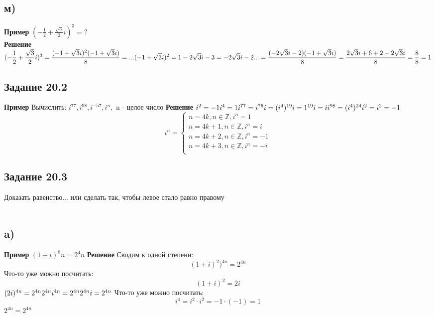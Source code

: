 \documentclass[12pt]{article}
\begin{document}
\newpage
\subsection{м)}
\textbf{Пример}
$
\displaystyle
(-\frac{1}{2} +\frac{\sqrt3}{2}i)^3=?
$\\
\textbf{Решение}
$
\displaystyle
(-\frac{1}{2} +\frac{\sqrt3}{2}i)^3=
\frac{(-1+\sqrt3i)^2(-1+\sqrt3i)}{8}=...\\
\\
(-1+\sqrt3i)^2=1-2\sqrt3i-3=-2\sqrt3i-2\\
\\
...=\frac{(-2\sqrt3i-2)(-1+\sqrt3i)}{8}=
\frac{2\sqrt3i+6+2-2\sqrt3i}{8}=
\frac{8}{8}=1
$

\newpage
\subsection{Задание 20.2}

\textbf{Пример}
Вычислить: 
$
i^{77}, i^{98}, i^{-57}, i^n,
$ n  - целое число
\textbf{Решение}
$
i^2=-1\\
i^4=1\\
i^{77}=i^{76}i=(i^4)^{19}i=1^{19}i=i\\
i^{98}=(i^4)^{24}i^2=i^2=-1\\
$
\begin{equation*}
i^n= 
 \begin{cases}
n = 4k,n \in \mathbb {Z}, i^n = 1\\
n = 4k+1,n \in \mathbb {Z}, i^n = i\\
n = 4k+2,n \in \mathbb {Z}, i^n = -1\\
n = 4k+3,n \in \mathbb {Z}, i^n = -i\\   
 \end{cases}
\end{equation*}

\newpage
\subsection{Задание 20.3}
Доказать равенство... или сделать так, чтобы левое стало равно правому\\
\\
\subsection{a)}
\textbf{Пример}
$
(1+i)^8n=2^4n
$
\textbf{Решение}
Сводим к одной степени:
$$
(1+i)^2)^{4n}=2^{4n}
$$
Что-то уже можно посчитать:
$$
(1+i)^2 = 2i
$$
$
(2i)^{4n}=2^{4n}
2^{4n}i^{4n}=2^{4n}
2^{4n}i=2^{4n} \\
$
Что-то уже можно посчитать:
$$
i^4=i^2\cdot i^2=-1\cdot(-1)=1
$$
$
2^{4n}=2^{4n}
$
\end{document}
